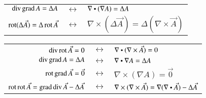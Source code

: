 \begin{center}
    \begin{tabular}[]{r c l}
        $ \operatorname{div} \operatorname{grad} A = \Delta A $ & $\leftrightarrow$ & $ \nabla \dotp (\nabla A) = \Delta A $ \\
        $ \operatorname{rot} (\Delta \vec{A}) = \Delta \operatorname{rot} \vec{A} $ & $\leftrightarrow$ & $ \nabla \times (\Delta \vec{A}) = \Delta (\nabla \times \vec{A}) $ \\
    \end{tabular}
\end{center}

\begin{center}
    \begin{tabular}[]{r c l}
        $ \operatorname{div} \operatorname{rot} \vec{A} = 0 $ & $\leftrightarrow$ & $ \nabla \dotp (\nabla \times \vec{A}) = 0 $ \\
        $ \operatorname{div} \operatorname{grad} A = \Delta A $ & $\leftrightarrow$ & $\nabla \dotp \nabla A = \Delta A $ \\
        $ \operatorname{rot} \operatorname{grad} \vec{A} = \vec{0} $ & $\leftrightarrow$ & $ \nabla \times (\nabla A) = \vec{0} $ \\
        $ \operatorname{rot} \operatorname{rot} \vec{A} = \operatorname{grad} \operatorname{div} \vec{A} - \Delta \vec{A} $ & $\leftrightarrow$ & $\nabla \times (\nabla \times \vec{A}) = \nabla (\nabla \dotp \vec{A}) - \Delta \vec{A} $ \\
    \end{tabular}
\end{center}

%
%


